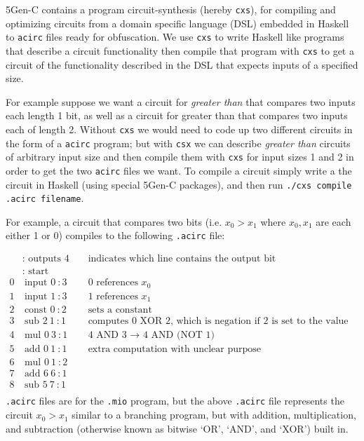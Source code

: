 \documentclass[12pt,twoside]{reedthesis}
\begin{document}
   5Gen-C contains a program circuit-synthesis (hereby \texttt{cxs}), for compiling and optimizing circuits from a domain specific language (DSL) embedded in Haskell to \texttt{acirc} files ready for obfuscation. We use \texttt{cxs} to write Haskell like programs that describe a circuit functionality then compile that program with \texttt{cxs} to get a circuit of the functionality described in the DSL that expects inputs of a specified size.
   \par For example suppose we want a circuit for \textit{greater than} that compares two inputs each length 1 bit, as well as a circuit for greater than that compares two inputs each of length 2. Without \texttt{cxs} we would need to code up two different circuits in the form of a \texttt{acirc} program; but with \texttt{csx} we can describe \textit{greater than} circuits of arbitrary input size and then compile them with \texttt{cxs} for input sizes 1 and 2 in order to get the two \texttt{acirc} files we want. To compile a circuit simply write a the circuit in Haskell (using special 5Gen-C packages), and then run \texttt{./cxs compile .acirc filename}.
   \par For example, a circuit that compares two bits (i.e. $x_0 > x_1$ where $x_0,x_1$ are each either 1 or 0) compiles to the following \texttt{.acirc} file:
   
   \newcommand{\sub}[0]{\text{ sub }}
   \newcommand{\mul}[0]{\text{ mul }}
   \begin{align*}
  &\text{: outputs } 4 &&\text{ indicates which line contains the output bit} \\
  &\text{: start }  & \\
0&\ \text{input } 0\ : 3  &&\text{ 0 references $x_0$} \\
1&\ \text{input } 1\ : 3  &&\text{ 1 references $x_1$} \\
2&\ \text{const } 0\ : 2 &&\text{ sets a constant} \\
3&\ \text{sub } 2\ 1\ : 1 &&\text{ computes 0 XOR 2, which is negation if 2 is set to the value ``1''} \\
4&\ \text{mul } 0\ 3\ : 1 &&\text{ 4 AND 3 $\to$ 4 AND (NOT 1)} \\
5&\ \text{add } 0\ 1\ : 1 &&\text{ extra computation with unclear purpose} \\
6&\ \text{mul } 0\ 1\ : 2 &&\\ 
7&\ \text{add } 6\ 6\ : 1&&\\
8&\ \text{sub } 5\ 7\ : 1&&\\
   \end{align*} 
   \texttt{.acirc} files are for the \texttt{.mio} program, but the above \texttt{.acirc} file represents the circuit $x_0 > x_1$ similar to a branching program, but with addition, multiplication, and subtraction (otherwise known as bitwise `OR', `AND', and `XOR') built in.          
         
\end{document}
